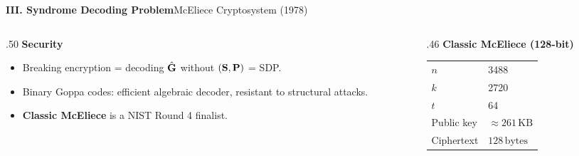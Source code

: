 \begin{frame}[shrink=5]{\textbf{III. Syndrome Decoding Problem}}{McEliece Cryptosystem (1978)}
\begin{columns}[T,onlytextwidth]
\begin{column}{.50\textwidth}
\textcolor{TealDarkCyan}{\textbf{Security}}
\begin{itemize}
  \item Breaking encryption = decoding $\hat{\mathbf{G}}$ without $(\mathbf{S},\mathbf{P})$ = SDP.
  \item Binary Goppa codes: efficient algebraic decoder, resistant to structural attacks.
  \item \textbf{Classic McEliece} is a NIST Round 4 finalist.
\end{itemize}
\end{column}
\begin{column}{.46\textwidth}
\textcolor{TealDarkCyan}{\textbf{Classic McEliece (128-bit)}}
\begin{center}
\renewcommand{\arraystretch}{1.1}
\begin{tabular}{ll}
  $n$ & 3488 \\
  $k$ & 2720 \\
  $t$ & 64 \\
  Public key & $\approx 261\,\text{KB}$ \\
  Ciphertext & $128\,\text{bytes}$ \\
\end{tabular}
\end{center}
\end{column}
\end{columns}
\end{frame}

